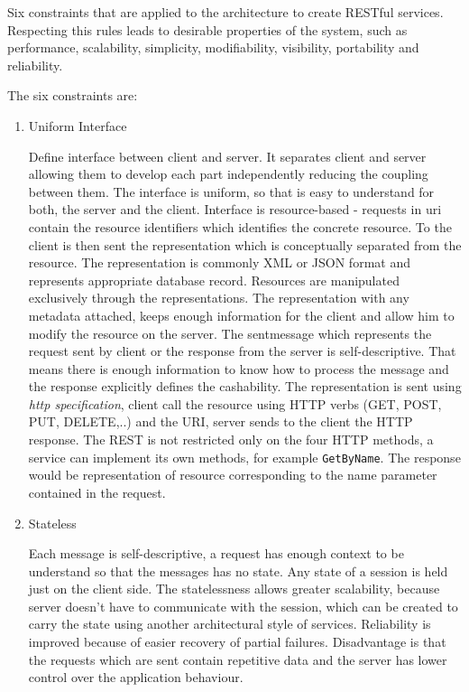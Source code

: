 Six constraints that are applied to the architecture to create RESTful services. Respecting this rules leads to desirable properties of the system, such as performance, scalability, simplicity, modifiability, visibility, portability and reliability. 
\begin{description}
  \item The six constraints are:
  

\begin{enumerate}
  \item Uniform Interface
  
Define interface between client and server. It separates client and server allowing them to develop each part independently reducing the coupling between them. The interface is uniform, so that is easy to understand for both, the server and the client.
Interface is resource-based - requests in \gls{uri} contain the resource identifiers which identifies the concrete resource. To the client is then sent the representation which is conceptually separated from the resource. The representation is commonly XML or JSON format and represents appropriate database record.
Resources are manipulated exclusively through the representations. The representation with any metadata attached, keeps enough information for the client and allow him to modify the resource on the server.
The sentmessage which represents the request sent by client or the response from the server is self-descriptive. That means there is enough information to know how to process the message and the response explicitly defines the cashability.
The representation is sent using \emph{\gls{http} specification}, client call the resource using HTTP verbs (GET, POST, PUT, DELETE,..) and the URI, server sends to the client the HTTP response.
The REST is not restricted only on the four HTTP methods, a service can implement its own methods, for example \texttt{GetByName}. The response would be representation of resource corresponding to the name parameter contained in the request. 

  \item Stateless
  
Each message is self-descriptive, a request has enough context to be understand so that the messages has no state. Any state of a \gls{session} is held just on the client side.
The statelessness allows greater scalability, because server doesn't have to communicate with the session, which can be created to carry the state using another architectural style of services. Reliability is improved because of easier recovery of partial failures. Disadvantage is that the requests which are sent contain repetitive data and the server has lower control over the application behaviour.


\end{enumerate}
\end{description}
